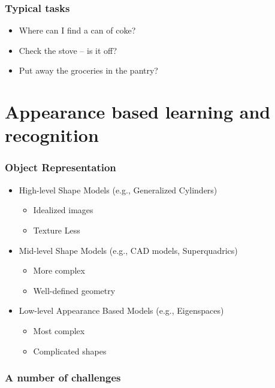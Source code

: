 \documentclass[10pt]{beamer}
\begin{document}
\begin{frame}
  \frametitle{Typical tasks}
  \begin{itemize}
  \item Where can I find a can of coke? 
  \item Check the stove -- is it off? 
  \item Put away the groceries in the pantry? 
  \end{itemize}
\end{frame}

\section{Appearance based learning and recognition}
\label{sec:appearance}

\begin{frame}
  \frametitle{Object Representation}
  \begin{itemize}
  \item High-level Shape Models (e.g., Generalized Cylinders)
    \begin{itemize}
    \item Idealized images
    \item Texture Less
    \end{itemize}
  \item Mid-level Shape Models (e.g., CAD models, Superquadrics)
    \begin{itemize}
    \item More complex
    \item Well-defined geometry
    \end{itemize}
  \item {\color{red} Low-level Appearance Based Models} (e.g., Eigenspaces)
    \begin{itemize}
    \item Most complex
    \item Complicated shapes
    \end{itemize}
  \end{itemize}
\end{frame}

\begin{frame}
  \frametitle{A number of challenges}
\end{frame}
\end{document}

